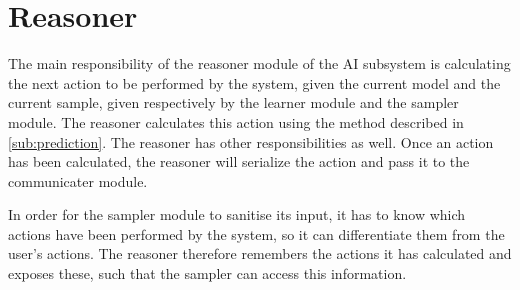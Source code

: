 \section{Reasoner}\label{sec:Reasoner}
The main responsibility of the reasoner module of the AI subsystem is calculating the next action to be performed by the system, given the current model and the current sample, given respectively by the learner module and the sampler module.
The reasoner calculates this action using the method described in \cref{sub:prediction}.
The reasoner has other responsibilities as well. Once an action has been calculated, the reasoner will serialize the action and pass it to the communicater module.

In order for the sampler module to sanitise its input, it has to know which actions have been performed by the system, so it can differentiate them from the user's actions. The reasoner therefore remembers the actions it has calculated and exposes these, such that the sampler can access this information.

